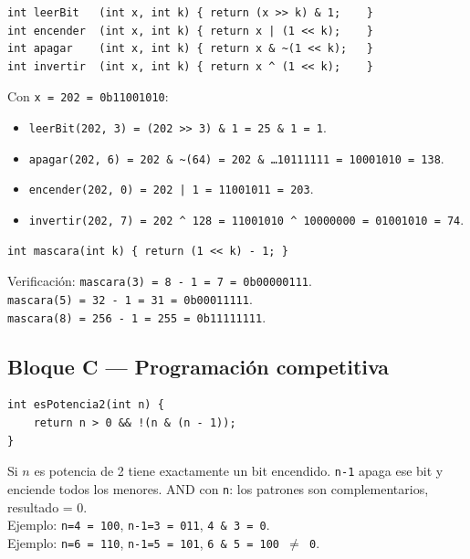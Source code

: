 \documentclass[12pt, oneside]{article}
\begin{document}
\begin{notaprofesor}
\begin{verbatim}
int leerBit   (int x, int k) { return (x >> k) & 1;    }
int encender  (int x, int k) { return x | (1 << k);    }
int apagar    (int x, int k) { return x & ~(1 << k);   }
int invertir  (int x, int k) { return x ^ (1 << k);    }
\end{verbatim}

  Con \texttt{x = 202 = 0b11001010}:
  \begin{itemize}
    \item \texttt{leerBit(202, 3) = (202 >> 3) \& 1 = 25 \& 1 = 1}. \checkmark
    \item \texttt{apagar(202, 6)  = 202 \& \textasciitilde(64) = 202 \& \ldots10111111
          = 10001010 = 138}. \checkmark
    \item \texttt{encender(202, 0) = 202 | 1 = 11001011 = 203}. \checkmark
    \item \texttt{invertir(202, 7) = 202 \^{} 128 = 11001010 \^{} 10000000
          = 01001010 = 74}. \checkmark
  \end{itemize}
\end{notaprofesor}

\begin{notaprofesor}
\begin{verbatim}
int mascara(int k) { return (1 << k) - 1; }
\end{verbatim}
  Verificación: \texttt{mascara(3) = 8 - 1 = 7 = 0b00000111}. \checkmark\\
  \texttt{mascara(5) = 32 - 1 = 31 = 0b00011111}. \checkmark\\
  \texttt{mascara(8) = 256 - 1 = 255 = 0b11111111}. \checkmark
\end{notaprofesor}

\subsection{Bloque C — Programación competitiva}

\begin{notaprofesor}
\begin{verbatim}
int esPotencia2(int n) {
    return n > 0 && !(n & (n - 1));
}
\end{verbatim}
  Si $n$ es potencia de 2 tiene exactamente un bit encendido.
  \texttt{n-1} apaga ese bit y enciende todos los menores.
  AND con \texttt{n}: los patrones son complementarios, resultado = 0.\\[4pt]
  Ejemplo: \texttt{n=4 = 100}, \texttt{n-1=3 = 011}, \texttt{4 \& 3 = 0}. \checkmark\\
  Ejemplo: \texttt{n=6 = 110}, \texttt{n-1=5 = 101}, \texttt{6 \& 5 = 100 $\neq$ 0}. \checkmark
\end{notaprofesor}
\end{document}
